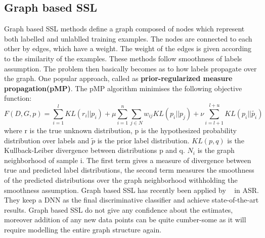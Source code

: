 \documentclass[a4paper,11pt]{kth-mag}
\begin{document}
\subsection{Graph based SSL}
Graph based SSL methods define a graph composed of nodes which represent both labelled and unlablled training examples. The nodes are connected to each other by edges, which have a weight. The weight of the edges is given according to the similarity of the examples. These methods follow smoothness of labels assumption. The problem then basically becomes as to how labels propagate over the graph. One popular approach, called as \textbf{prior-regularized measure propagation(pMP)}. The pMP algorithm minimises the following objective function:
\begin{equation}
F(D, G, p) = \sum_{i=1}^{l}KL(r_{i}||p_{i}) + \mu \sum_{i=1}^{n} \sum_{j\in N}w_{ij}KL(p_{i}||p_{j}) + \nu \sum_{i=l+1}^{l+u}KL(p_{i}||\widetilde{p_{i}})
\end{equation}
where r is the true unknown distribution, p is the hypothesized probability distribution over labels and $\widetilde{p}$ is the prior label distribution. $KL(p,q)$ is the Kullback-Leiber divergence between distributions p and q. $N_{i}$ is the graph neighborhood of sample i. The first term gives a measure of divergence between true and predicted label distributions, the second term measures the smoothness of the predicted distributions over the graph neighborhood withholding the smoothness assumption. Graph based SSL has recently been applied by ~\cite{liu-2013} in ASR. They keep a DNN as the final discriminative classifier and achieve state-of-the-art results. Graph based SSL do not give any confidence about the estimates, moreover addition of any new data points can be quite cumber-some as it will require modelling the entire graph structure again. 
\end{document}
